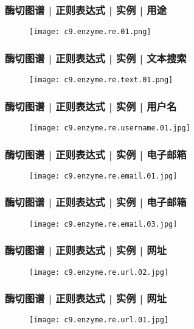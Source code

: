 \begin{frame}
  \frametitle{酶切图谱 | 正则表达式 | 实例 | 用途}
  \begin{figure}
    \centering
    \texttt{[image: c9.enzyme.re.01.png]}
  \end{figure}
\end{frame}

\begin{frame}
  \frametitle{酶切图谱 | 正则表达式 | 实例 | 文本搜索}
  \begin{figure}
    \centering
    \texttt{[image: c9.enzyme.re.text.01.png]}
  \end{figure}
\end{frame}

\begin{frame}
  \frametitle{酶切图谱 | 正则表达式 | 实例 | 用户名}
  \begin{figure}
    \centering
    \texttt{[image: c9.enzyme.re.username.01.jpg]}
  \end{figure}
\end{frame}

\begin{frame}
  \frametitle{酶切图谱 | 正则表达式 | 实例 | 电子邮箱}
  \begin{figure}
    \centering
    \texttt{[image: c9.enzyme.re.email.01.jpg]}
  \end{figure}
\end{frame}

\begin{frame}
  \frametitle{酶切图谱 | 正则表达式 | 实例 | 电子邮箱}
  \begin{figure}
    \centering
    \texttt{[image: c9.enzyme.re.email.03.jpg]}
  \end{figure}
\end{frame}

\begin{frame}
  \frametitle{酶切图谱 | 正则表达式 | 实例 | 网址}
  \begin{figure}
    \centering
    \texttt{[image: c9.enzyme.re.url.02.jpg]}
  \end{figure}
\end{frame}

\begin{frame}
  \frametitle{酶切图谱 | 正则表达式 | 实例 | 网址}
  \begin{figure}
    \centering
    \texttt{[image: c9.enzyme.re.url.01.jpg]}
  \end{figure}
\end{frame}


